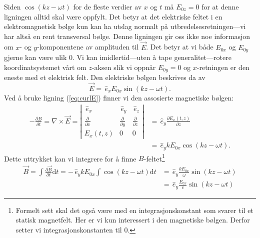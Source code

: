 \documentclass[a4paper,norsk,12pt]{article}
\def\d{\ensuremath{\text{d}}}
\def\ex{\ensuremath{\,{\hat{e}_x}}}
\def\ey{\ensuremath{\,{\hat{e}_y}}}
\def\ez{\ensuremath{\,{\hat{e}_z}}}
\begin{document}
Siden $\cos(kz-\omega t)$ for de fleste verdier av $x$ og $t$ må $E_{0z}=0$ for at denne ligningen alltid skal være oppfylt. Det betyr at det elektriske feltet i en elektromagnetisk bølge kun kan ha utslag normalt på utbredelsesretningen---vi har altså en rent transversal bølge. Denne ligningen gir oss ikke noe informasjon om $x$- og $y$-komponentene av amplituden til $\vec{E}$. Det betyr at vi både $E_{0x}$ og $E_{0y}$ gjerne kan være ulik 0. Vi kan imidlertid---uten å tape generalitet---rotere koordinatsystemet vårt om $z$-aksen slik vi oppnår $E_{0y}=0$ og $x$-retningen er den eneste med et elektrisk felt. Den elektriske bølgen beskrives da av
\begin{displaymath}
	\vec{E} = \ex E_{0x}\sin(kz - \omega t).
\end{displaymath}
Ved å bruke ligning (\ref{eq:curlE}) finner vi den assosierte magnetiske bølgen:
\begin{align*}
	-\frac{\partial B}{\partial t} = \nabla\times\vec{E} = 
	\left|\begin{array}{ccc} 
		\ex & \ey & \ez \\ \frac{\partial}{\partial x} & \frac{\partial}{\partial y} & \frac{\partial}{\partial z} \\  E_x(t,z) & 0 & 0
	\end{array}\right| 
	&= \ey\frac{\partial E_x(t,z)}{\partial z}  \\
	&= \ey kE_{0x} \cos(kz-\omega t).
\end{align*}
Dette uttrykket kan vi integrere for å finne $B$-feltet\footnote{Formelt sett skal det også være med en integrasjonskonstant som svarer til et statisk magnetfelt. Her er vi kun interessert i den magnetiske bølgen. Derfor setter vi integrasjonskonstanten til 0.}
\begin{align*}
	\vec{B} = \int\frac{\partial \vec{B}}{\partial t}\d t = -\ey kE_{0x}\int\cos(kz-\omega t)\d t &= \ey\frac{kE_{0x}}{\omega}\sin(kz-\omega t)\\
	&= \ey\frac{E_{0x}}{c}\sin(kz-\omega t)
\end{align*}
\end{document}
